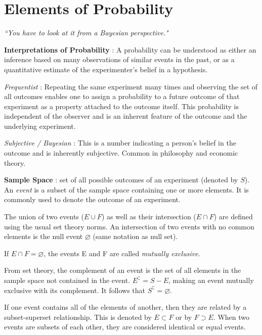 \chapter{Elements of Probability}


\begin{flushright}
	\textit{``You have to look at it from a Bayesian perspective."} 
\end{flushright}

\textbf{Interpretations of Probability} : A probability can be understood as either an inference based on many observations of similar events in the past, or as a quantitative estimate of the experimenter's belief in a hypothesis.

\textit{Frequentist} : Repeating the same experiment many times and observing the set of all outcomes enables one to assign a probability to a future outcome of that experiment as a property attached to the outcome itself. This probability is independent of the observer and is an inherent feature of the outcome and the underlying experiment.

\textit{Subjective / Bayesian} : This is a number indicating a person's belief in the outcome and is inherently subjective. Common in philosophy and economic theory.

\textbf{Sample Space} : set of all possible outcomes of an experiment (denoted by $ S $). An \textit{event} is a subset of the sample space containing one or more elements. It is commonly used to denote the outcome of an experiment.

The union of two events ($ E \cup F $) as well as their intersection ($ E \cap F $) are defined using the usual set theory norms. An intersection of two events with no common elements is the null event $ \varnothing $ (same notation as null set).

If $ E \cap F = \varnothing $, the events E and F are called \textit{mutually exclusive}.

From set theory, the complement of an event is the set of all elements in the sample space not contained in the event. $ E^{\complement}  = S - E$, making an event mutually exclusive with its complement. It follows that $ S^{\complement} = \varnothing $.

If one event contains all of the elements of another, then they are related by a subset-superset relationship. This is denoted by $ E \subset F $ or by $ F \supset E $. When two events are subsets of each other, they are considered identical or equal events.

